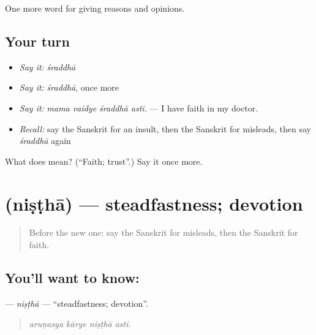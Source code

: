 \begin{grammarlens}[title={What you've built}]
One more word for giving reasons and opinions.
\end{grammarlens}

\subsection*{Your turn}
\begin{itemize}
\raggedright
  \item \emph{Say it:} \emph{śraddhā}
  \item \emph{Say it:} \emph{śraddhā}, once more
  \item \emph{Say it:} \emph{mama vaidye śraddhā asti.} — I have faith in my doctor.
  \item \emph{Recall:} say the Sanskrit for an insult, then the Sanskrit for misleads, then say \emph{śraddhā} again
\end{itemize}

\begin{tcolorbox}[breakable,colback=teal!4,colframe=teal!35!black,title={Before you move on}]
What does  mean? (\textquotedblleft{}Faith; trust\textquotedblright{}.) Say it once more.
\end{tcolorbox}
\section[\texorpdfstring{\sk{निष्ठा} (niṣṭhā)}{निष्ठा (niṣṭhā)}]{ (niṣṭhā) — steadfastness; devotion}

\label{lesson:SA-C361-nistha}



\begin{quote}
Before the new one: say the Sanskrit for misleads, then the Sanskrit for faith.
\end{quote}

\subsection*{You'll want to know: }
\textbf{} — \emph{niṣṭhā} — \textquotedblleft{}steadfastness; devotion\textquotedblright{}.

\begin{quote}
   
\end{quote}

\begin{quote}
\emph{aruṇasya kārye niṣṭhā asti.}
\end{quote}

